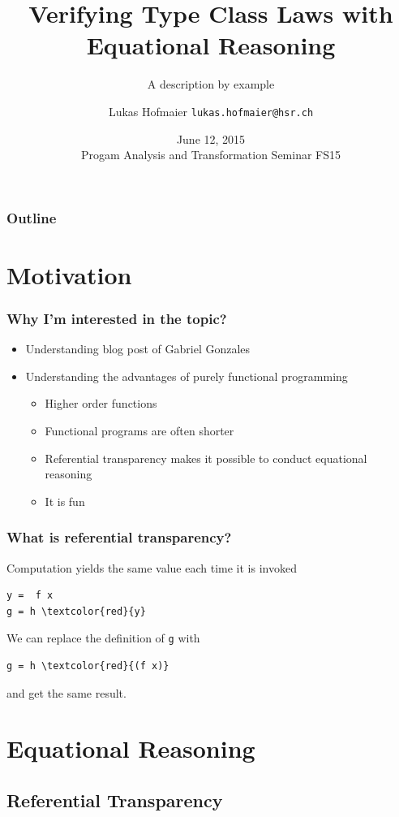 \documentclass{beamer}
\title{Verifying Type Class Laws with Equational Reasoning}
\subtitle{A description by example}
\author{Lukas Hofmaier \texttt{lukas.hofmaier@hsr.ch}}
\date{June 12, 2015 \\ Progam Analysis and Transformation Seminar FS15}
\begin{document}
\maketitle
\begin{frame}
  \frametitle{Outline}
  \tableofcontents
\end{frame}

\section{Motivation}

\begin{frame}
  \frametitle{Why I'm interested in the topic?}
\begin{itemize}
\item Understanding blog post of Gabriel Gonzales
\item Understanding the advantages of purely functional programming
  \begin{itemize}
  \item Higher order functions
  \item Functional programs are often shorter
  \item {\color{red} Referential transparency makes it possible to conduct equational reasoning}
  \item It is fun
  \end{itemize}
\end{itemize}
\end{frame}

\begin{frame}[fragile]
\frametitle{What is referential transparency?}
Computation yields the same value each time it is invoked
\begin{Verbatim}[commandchars=\\\{\}]
y =  f x
g = h \textcolor{red}{y} 
\end{Verbatim}
We can replace the definition of \verb|g| with
\begin{Verbatim}[commandchars=\\\{\}]
g = h \textcolor{red}{(f x)}
\end{Verbatim}
and get the same result.

\end{frame}
\section{Equational Reasoning}
\subsection{Referential Transparency}
\end{document}
